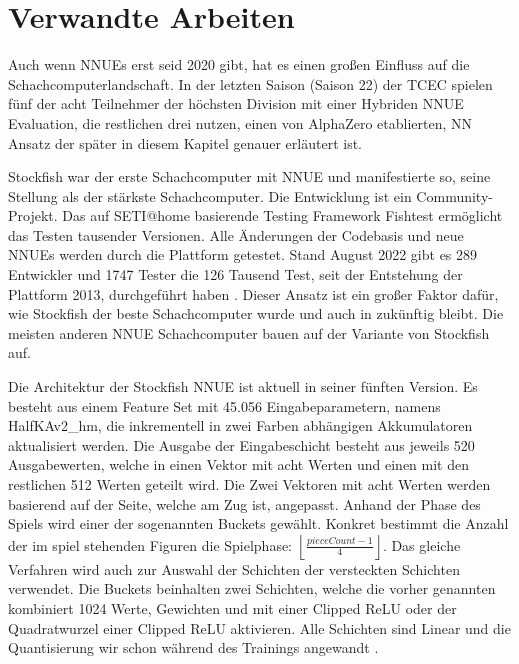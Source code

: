 \chapter{Verwandte Arbeiten}

Auch wenn \acp{NNUE} erst seid 2020 gibt, hat es einen großen Einfluss auf die Schachcomputerlandschaft. In der letzten Saison (Saison 22) der \ac{TCEC} \cite{TCEC22} spielen fünf der acht Teilnehmer der höchsten Division mit einer Hybriden \ac{NNUE} Evaluation, die restlichen drei nutzen, einen von AlphaZero etablierten, \ac{NN} Ansatz der später in diesem Kapitel genauer erläutert ist.


Stockfish war der erste Schachcomputer mit \ac{NNUE} und manifestierte so, seine Stellung als der stärkste Schachcomputer. Die Entwicklung ist ein Community-Projekt. Das auf SETI@home \cite{SETI2001} basierende Testing Framework Fishtest ermöglicht das Testen tausender Versionen. Alle Änderungen der Codebasis und neue \acp{NNUE} werden durch die Plattform getestet. Stand August 2022 gibt es 289 Entwickler und 1747 Tester die 126 Tausend Test, seit der Entstehung der Plattform 2013, durchgeführt haben \cite{FishtestUsers}. Dieser Ansatz ist ein großer Faktor dafür, wie Stockfish der beste Schachcomputer wurde und auch in zukünftig bleibt. Die meisten anderen \ac{NNUE} Schachcomputer bauen auf der Variante von Stockfish auf.
 
Die Architektur der Stockfish \ac{NNUE} ist aktuell in seiner fünften Version. Es besteht aus einem Feature Set mit 45.056 Eingabeparametern, namens HalfKAv2\_hm, die inkrementell in zwei Farben abhängigen Akkumulatoren aktualisiert werden. Die Ausgabe der Eingabeschicht besteht aus jeweils 520 Ausgabewerten, welche in einen Vektor mit acht Werten und einen mit den restlichen 512 Werten geteilt wird. Die Zwei Vektoren mit acht Werten werden basierend auf der Seite, welche am Zug ist, angepasst. Anhand der Phase des Spiels wird einer der sogenannten Buckets gewählt. Konkret bestimmt die Anzahl der im spiel stehenden Figuren die Spielphase: $\left \lfloor\frac{pieceCount-1}{4}\right \rfloor$. Das gleiche Verfahren wird auch zur Auswahl der Schichten der versteckten Schichten verwendet. Die Buckets beinhalten zwei Schichten, welche die vorher genannten kombiniert 1024 Werte, Gewichten und mit einer Clipped \ac{ReLU} oder der Quadratwurzel einer Clipped \ac{ReLU} aktivieren. Alle Schichten sind Linear und die Quantisierung wir schon während des Trainings angewandt \cite{StockfishNNUE}.

